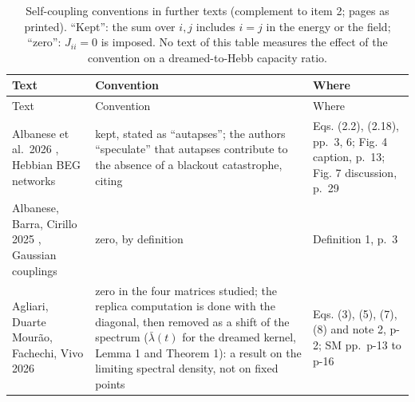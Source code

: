 \begin{longtable}[]{@{}
  >{\raggedright\arraybackslash}p{}
  >{\raggedright\arraybackslash}p{}
  >{\raggedright\arraybackslash}p{}@{}}
\caption{Self-coupling conventions in further texts (complement to item
2; pages as printed). ``Kept'': the sum over \(i, j\) includes \(i = j\)
in the energy or the field; ``zero'': \(J_{ii} = 0\) is imposed. No text
of this table measures the effect of the convention on a dreamed-to-Hebb
capacity ratio.}\label{tbl:conv}\tabularnewline
\toprule\noalign{}
\begin{minipage}[b]{\linewidth}\raggedright
Text
\end{minipage} & \begin{minipage}[b]{\linewidth}\raggedright
Convention
\end{minipage} & \begin{minipage}[b]{\linewidth}\raggedright
Where
\end{minipage} \\
\midrule\noalign{}
\endfirsthead
\toprule\noalign{}
\begin{minipage}[b]{\linewidth}\raggedright
Text
\end{minipage} & \begin{minipage}[b]{\linewidth}\raggedright
Convention
\end{minipage} & \begin{minipage}[b]{\linewidth}\raggedright
Where
\end{minipage} \\
\midrule\noalign{}
\endhead
\bottomrule\noalign{}
\endlastfoot
Albanese et al.~2026 \supercite{albanese2026serial}, Hebbian BEG networks
& kept, stated as ``autapses''; the authors ``speculate'' that autapses
contribute to the absence of a blackout catastrophe, citing
\supercite{vinci2025beyond} & Eqs. (2.2), (2.18), pp.~3, 6; Fig. 4
caption, p.~13; Fig. 7 discussion, p.~29 \\
Albanese, Barra, Cirillo 2025 \supercite{albanese2025guerra}, Gaussian
couplings & zero, by definition & Definition 1, p.~3 \\
Agliari, Duarte Mourão, Fachechi, Vivo 2026
\supercite{agliari2026spectral} & zero in the four matrices studied; the
replica computation is done with the diagonal, then removed as a shift
of the spectrum (\(\bar\lambda(t)\) for the dreamed kernel, Lemma 1 and
Theorem 1): a result on the limiting spectral density, not on fixed
points & Eqs. (3), (5), (7), (8) and note 2, p-2; SM pp.~p-13 to p-16 \\

\end{longtable}

